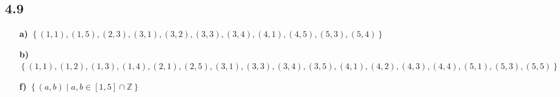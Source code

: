 \documentclass[10pt]{ctexart}
\begin{document}
    \subsection*{4.9}
        \begin{itemize}
            \item [\textbf{a)}] 
                $\left\{
                    (1, 1), (1, 5),
                    (2, 3),
                    (3, 1), (3, 2), (3, 3), (3, 4),
                    (4, 1), (4, 5),
                    (5, 3), (5, 4)
                \right\}$
            \item [\textbf{b)}] 
                $\left\{
                    (1, 1), (1, 2), (1, 3), (1, 4),
                    (2, 1), (2, 5),
                    (3, 1), (3, 3), (3, 4), (3, 5),
                    (4, 1), (4, 2), (4, 3), (4, 4),
                    (5, 1), (5, 3), (5, 5)
                \right\}$
            \item [\textbf{f)}] $\left\{(a, b) \mid a,b \in \left[1, 5\right] \cap \mathbb{Z}\right\}$
        \end{itemize}
\end{document}
